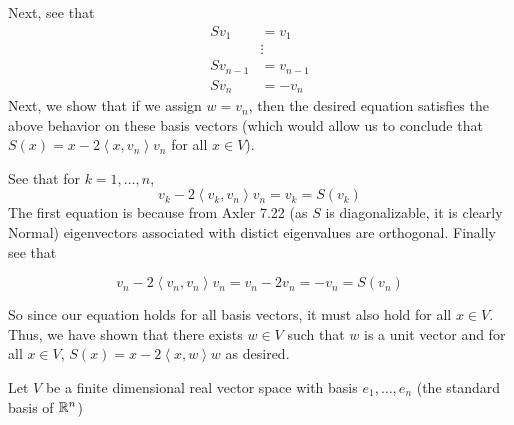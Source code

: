 \documentclass[answers]{exam}
\renewcommand{\L}[1]{\mathcal{L}\left(#1\right)}
\newcommand{\ip}[1]{\left\langle#1\right\rangle}
\begin{document}
\begin{questions}
\begin{parts}
\begin{solution}
            Next, see that
            \begin{align*}
                Sv_1 &= v_1 \\
                     &\vdots\\
                Sv_{n-1}&= v_{n-1}\\
                Sv_n &= -v_n
            \end{align*}
            Next, we show that if we assign $w=v_n$, then the desired equation satisfies the above behavior on 
            these basis vectors (which would allow us to conclude that $S(x) = x - 2\ip{x,v_n}v_n$ for all
            $x\in V$).


            See that for $k=1,\dots,n$, 
            \[
                v_k - 2\ip{v_k,v_n}v_n = v_k = S(v_k)
            \]
            The first equation is because from Axler 7.22 (as $S$ is diagonalizable, it is clearly Normal) 
            eigenvectors associated with distict eigenvalues are orthogonal. Finally see that

            \[
                v_n - 2\ip{v_n,v_n}v_n = v_n - 2v_n = -v_n = S(v_n)
            \]

            So since our equation holds for all basis vectors, it must also hold for all $x\in V$. Thus, we have
            shown that there exists $w\in V$ such that $w$ is a unit vector and  
            for all $x\in V$, $S(x) = x - 2\ip{x,w}w$ as desired.

        \end{solution}
    \end{parts}
    \question Let $V$ be a finite dimensional real vector space with basis $e_1,\dots,e_n$ (the standard basis of
    $\mathbb{R}^n$)
\end{questions}
\end{document}
